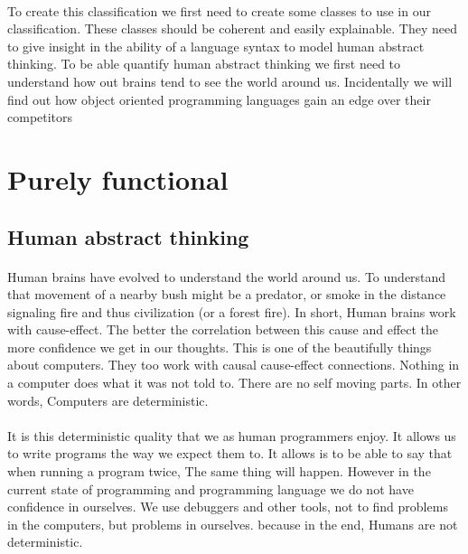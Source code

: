 \documentclass{scrartcl}
\begin{document}
    \paragraph{}
    To create this classification we first need to create some classes to use 
    in our classification. These classes should be coherent and easily explainable.
    They need to give insight in the ability of a language syntax to model human abstract thinking.
    To be able quantify human abstract thinking we first need to understand how
    out brains tend to see the world around us. Incidentally we will find out how
    object oriented programming languages gain an edge over their competitors
    \newpage

    \section{Purely functional}
    \subsection{Human abstract thinking}
    \paragraph{}
    Human brains have evolved to understand the world around us. To understand that
    movement of a nearby bush might be a predator, or smoke in the distance
    signaling fire and thus civilization (or a forest fire). In short, Human brains
    work with cause-effect. The better the correlation between this cause and effect
    the more confidence we get in our thoughts. This is one of the beautifully things 
    about computers. They too work with causal cause-effect connections. Nothing in a
    computer does what it was not told to. There are no self moving parts. In other words,
    Computers are deterministic. 

    \paragraph{}
    It is this deterministic quality that we as human programmers enjoy. It allows
    us to write programs the way we expect them to. It allows is to be able to say that
    when running a program twice, The same thing will happen. However in the current state
    of programming and programming language we do not have confidence in ourselves. 
    We use debuggers and other tools, not to find problems in the computers, but problems in
    ourselves. because in the end, Humans are not deterministic.
\end{document}
